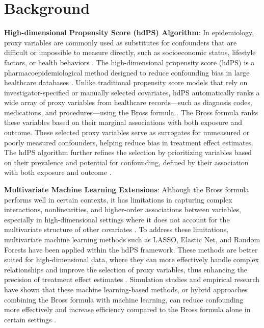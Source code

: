 \documentclass[sn-vancouver,Numbered,lineno,pdflatex]{sn-jnl}
\begin{document}

\maketitle

\section{Background}\label{background}

\textbf{High-dimensional Propensity Score (hdPS) Algorithm}: In
epidemiology, proxy variables are commonly used as substitutes for
confounders that are difficult or impossible to measure directly, such
as socioeconomic status, lifestyle factors, or health behaviors
\citep{vanderweele2019principles}. The high-dimensional propensity score
(hdPS) is a pharmacoepidemiological method designed to reduce
confounding bias in large healthcare databases
\citep{schneeweiss2009high}. Unlike traditional propensity score models
that rely on investigator-specified or manually selected covariates,
hdPS automatically ranks a wide array of proxy variables from healthcare
records---such as diagnosis codes, medications, and procedures---using
the Bross formula \citep{wyss2018erratum, bross1966spurious}. The Bross
formula ranks these variables based on their marginal associations with
both exposure and outcome. These selected proxy variables serve as
surrogates for unmeasured or poorly measured confounders, helping reduce
bias in treatment effect estimates. The hdPS algorithm further refines
the selection by prioritizing variables based on their prevalence and
potential for confounding, defined by their association with both
exposure and outcome \citep{schneeweiss2009high}.

\textbf{Multivariate Machine Learning Extensions}: Although the Bross
formula performs well in certain contexts, it has limitations in
capturing complex interactions, nonlinearities, and higher-order
associations between variables, especially in high-dimensional settings
where it does not account for the multivariate structure of other
covariates \citep{karim2024high, karim2018can}. To address these
limitations, multivariate machine learning methods such as LASSO,
Elastic Net, and Random Forests have been applied within the hdPS
framework. These methods are better suited for high-dimensional data,
where they can more effectively handle complex relationships and improve
the selection of proxy variables, thus enhancing the precision of
treatment effect estimates
\citep{karim2018can, schneeweiss2017variable, franklin2015regularized}.
Simulation studies and empirical research have shown that these machine
learning-based methods, or hybrid approaches combining the Bross formula
with machine learning, can reduce confounding more effectively and
increase efficiency compared to the Bross formula alone in certain
settings
\citep{karim2018can, schneeweiss2017variable, franklin2015regularized}.
\end{document}
